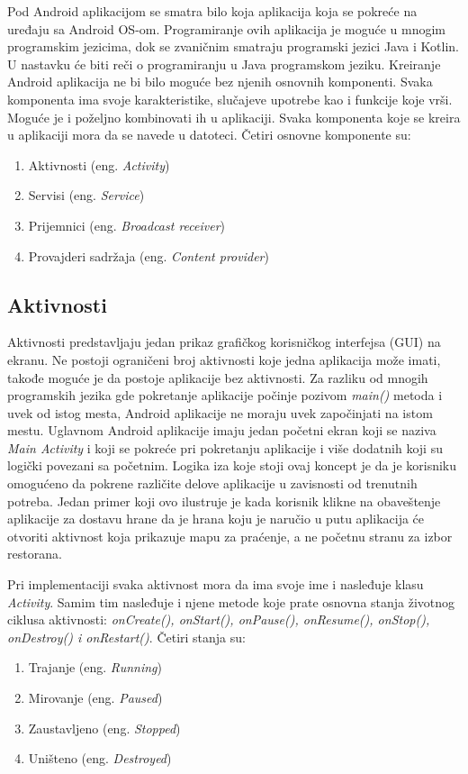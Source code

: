 \documentclass[android.tex]{subfiles}
\begin{document}
Pod Android aplikacijom se smatra bilo koja aplikacija koja se pokreće na uređaju sa Android OS-om. Programiranje ovih aplikacija je moguće u mnogim programskim jezicima, dok se zvaničnim smatraju programski jezici Java i Kotlin.\cite{sajt:kotlin} U nastavku će biti reči o programiranju u Java programskom jeziku. 
Kreiranje Android aplikacija ne bi bilo moguće bez njenih osnovnih komponenti. Svaka komponenta ima svoje karakteristike, slučajeve upotrebe kao i funkcije koje vrši. Moguće je i poželjno kombinovati ih u aplikaciji. Svaka komponenta koje se kreira u aplikaciji mora da se navede u  datoteci. Četiri osnovne komponente su:

\begin{enumerate}
\item Aktivnosti (eng. \textit{Activity})
\item Servisi (eng. \textit{Service})
\item Prijemnici (eng. \textit{Broadcast receiver})
\item Provajderi sadržaja (eng. \textit{Content provider})
\end{enumerate}

\subsection{Aktivnosti}
Aktivnosti predstavljaju jedan prikaz grafičkog korisničkog interfejsa (GUI) na ekranu. Ne postoji ograničeni broj aktivnosti koje jedna aplikacija može imati, takođe moguće je da postoje aplikacije bez aktivnosti. Za razliku od mnogih programskih jezika gde pokretanje aplikacije počinje pozivom \textit{main() }metoda i uvek od istog mesta, Android aplikacije ne moraju uvek započinjati na istom mestu. Uglavnom Android aplikacije imaju jedan početni ekran koji se naziva \textit{Main Activity} i  koji se pokreće pri pokretanju aplikacije i više dodatnih koji su logički povezani sa početnim. Logika iza koje stoji ovaj koncept je da je korisniku omogućeno da pokrene različite delove aplikacije u zavisnosti od trenutnih potreba. Jedan primer koji ovo ilustruje je kada korisnik klikne na obaveštenje aplikacije za dostavu hrane da je hrana koju je naručio u putu aplikacija će otvoriti aktivnost koja prikazuje mapu za praćenje, a ne početnu stranu za izbor restorana.

Pri implementaciji svaka aktivnost mora da ima svoje ime i nasleđuje klasu \textit{Activity}. Samim tim nasleđuje i njene metode koje prate osnovna stanja životnog ciklusa aktivnosti: \textit{onCreate(), onStart(), onPause(), onResume(), onStop(), onDestroy() i onRestart()}\cite{book:and9cookbook}. Četiri stanja su:
\begin{enumerate}
    \item Trajanje (eng. \textit{Running})
    \item Mirovanje (eng.\textit{ Paused})
    \item Zaustavljeno (eng. \textit{Stopped})
    \item Uništeno (eng. \textit{Destroyed})
\end{enumerate}
\end{document}
